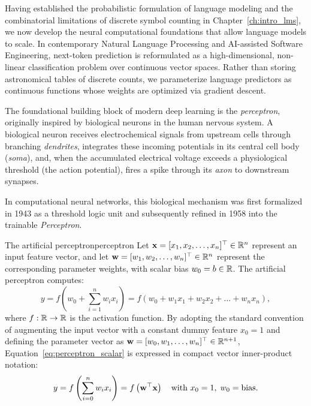 \documentclass[../../main.tex]{subfiles}
\begin{document}
Having established the probabilistic formulation of language modeling and the combinatorial limitations of discrete symbol counting in Chapter~\ref{ch:intro_lms}, we now develop the neural computational foundations that allow language models to scale. In contemporary Natural Language Processing and AI-assisted Software Engineering, next-token prediction is reformulated as a high-dimensional, non-linear classification problem over continuous vector spaces. Rather than storing astronomical tables of discrete counts, we parameterize language predictors as continuous functions whose weights are optimized via gradient descent.

The foundational building block of modern deep learning is the \emph{perceptron}, originally inspired by biological neurons in the human nervous system. A biological neuron receives electrochemical signals from upstream cells through branching \emph{dendrites}, integrates these incoming potentials in its central cell body (\emph{soma}), and, when the accumulated electrical voltage exceeds a physiological threshold (the action potential), fires a spike through its \emph{axon} to downstream synapses.

In computational neural networks, this biological mechanism was first formalized in 1943 \cite{mcculloch1943} as a threshold logic unit and subsequently refined in 1958 \cite{rosenblatt1958} into the trainable \emph{Perceptron}.

\begin{definition}{The artificial perceptron}{perceptron}
Let $\mathbf{x} = [x_1, x_2, \dots, x_n]^\top \in \mathbb{R}^n$ represent an input feature vector, and let $\mathbf{w} = [w_1, w_2, \dots, w_n]^\top \in \mathbb{R}^n$ represent the corresponding parameter weights, with scalar bias $w_0 = b \in \mathbb{R}$. The artificial perceptron computes:
\begin{equation}
\label{eq:perceptron_scalar}
y = f\left( w_0 + \sum_{i=1}^n w_i x_i \right) = f\left( w_0 + w_1 x_1 + w_2 x_2 + \dots + w_n x_n \right),
\end{equation}
where $f: \mathbb{R} \to \mathbb{R}$ is the activation function. By adopting the standard convention of augmenting the input vector with a constant dummy feature $x_0 = 1$ and defining the parameter vector as $\mathbf{w} = [w_0, w_1, \dots, w_n]^\top \in \mathbb{R}^{n+1}$, Equation~\eqref{eq:perceptron_scalar} is expressed in compact vector inner-product notation:
\begin{equation}
\label{eq:perceptron_vector}
y = f\left( \sum_{i=0}^n w_i x_i \right) = f\left( \mathbf{w}^\top \mathbf{x} \right) \quad \text{with } x_0 = 1, \; w_0 = \text{bias}.
\end{equation}
\end{definition}
\end{document}
